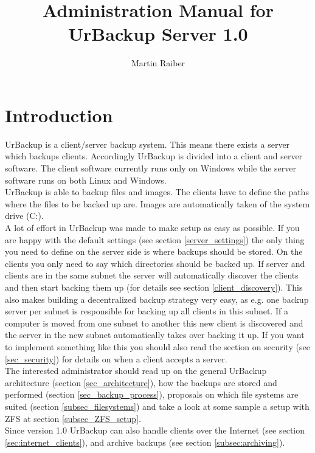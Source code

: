 \documentclass[a4paper,10pt]{article} \usepackage[breaklinks=true]{hyperref}
\begin{document}

\author{Martin Raiber}
\title{Administration Manual for\\UrBackup Server 1.0}

\maketitle

\tableofcontents

\section{Introduction}

UrBackup is a client/server backup system. This means there exists a server
which backups clients. Accordingly UrBackup is divided into a client and server
software. The client software currently runs only on Windows while the server
software runs on both Linux and Windows.\\
UrBackup is able to backup files and images. The clients have to define the
paths where the files to be backed up are. Images are automatically taken of the
system drive (C:).\\
A lot of effort in UrBackup was made to make setup as easy as possible. If you
are happy with the default settings (see section \ref{server_settings}) the only
thing you need to define on the server side is where backups should be stored.
On the clients you only need to say which directories should be backed up. If
server and clients are in the same subnet the server will automatically discover
the clients and then start backing them up (for details see section
\ref{client_discovery}). This also makes building a decentralized backup
strategy very easy, as e.g. one backup server per subnet is responsible for
backing up all clients in this subnet. If a computer is moved from one subnet to
another this new client is discovered and the server in the new subnet
automatically takes over backing it up. If you want to implement something like
this you should also read the section on security (see \ref{sec_security}) for
details on when a client accepts a server.\\
The interested administrator should read up on the general UrBackup architecture
(section \ref{sec_architecture}), how the backups are stored and performed
(section \ref{sec_backup_process}), proposals on which file systems are suited
(section \ref{subsec_filesystems}) and take a look at some sample a setup with
ZFS at section \ref{subsec_ZFS_setup}.\\
Since version 1.0 UrBackup can also handle clients over the Internet (see section
\ref{sec:internet_clients}), and archive backups (see section \ref{subsec:archiving}).
\end{document}
